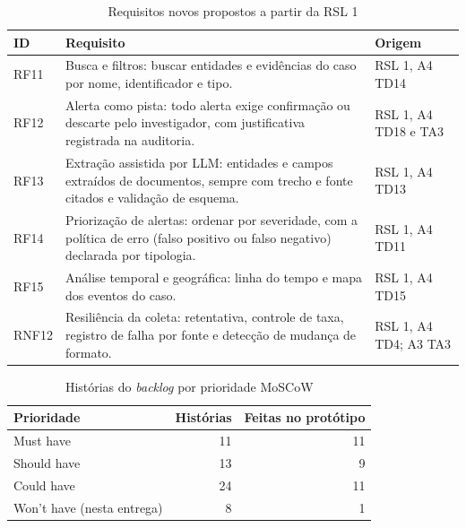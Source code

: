 \begin{table}[htbp]
\centering
\caption{Requisitos novos propostos a partir da RSL 1}
\label{tab:req-novos}
\small
\begin{tabular}{lp{9.2cm}p{3cm}}
\hline
\textbf{ID} & \textbf{Requisito} & \textbf{Origem} \\
\hline
RF11 & Busca e filtros: buscar entidades e evidências do caso por nome, identificador e tipo. & RSL 1, A4 TD14 \\
RF12 & Alerta como pista: todo alerta exige confirmação ou descarte pelo investigador, com justificativa registrada na auditoria. & RSL 1, A4 TD18 e TA3 \\
RF13 & Extração assistida por LLM: entidades e campos extraídos de documentos, sempre com trecho e fonte citados e validação de esquema. & RSL 1, A4 TD13 \\
RF14 & Priorização de alertas: ordenar por severidade, com a política de erro (falso positivo ou falso negativo) declarada por tipologia. & RSL 1, A4 TD11 \\
RF15 & Análise temporal e geográfica: linha do tempo e mapa dos eventos do caso. & RSL 1, A4 TD15 \\
RNF12 & Resiliência da coleta: retentativa, controle de taxa, registro de falha por fonte e detecção de mudança de formato. & RSL 1, A4 TD4; A3 TA3 \\
\hline
\end{tabular}
\end{table}

\begin{table}[htbp]
\centering
\caption{Histórias do \textit{backlog} por prioridade MoSCoW}
\label{tab:moscow-resumo}
\small
\begin{tabular}{lrr}
\hline
\textbf{Prioridade} & \textbf{Histórias} & \textbf{Feitas no protótipo} \\
\hline
Must have & 11 & 11 \\
Should have & 13 & 9 \\
Could have & 24 & 11 \\
Won't have (nesta entrega) & 8 & 1 \\
\hline
\end{tabular}
\end{table}

